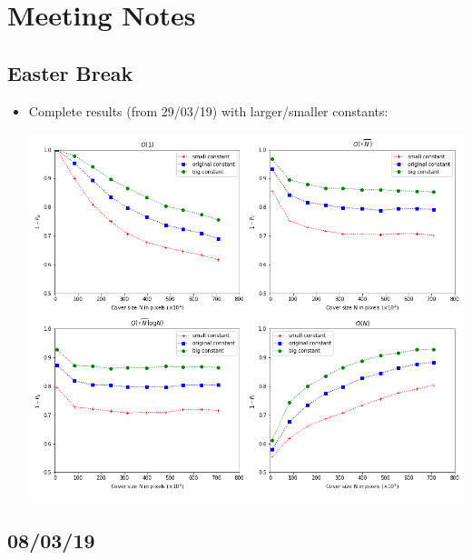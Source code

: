 \documentclass[11pt,a4paper]{report}
\begin{document}
\chapter{Meeting Notes}

\section{Easter Break}

\begin{itemize}

  \item Complete results (from 29/03/19) with larger/smaller constants:
    \begin{center}
      \includegraphics[width=\linewidth]{graph_29_03_2019.png}
    \end{center}

\end{itemize}

\section{08/03/19}
\end{document}
